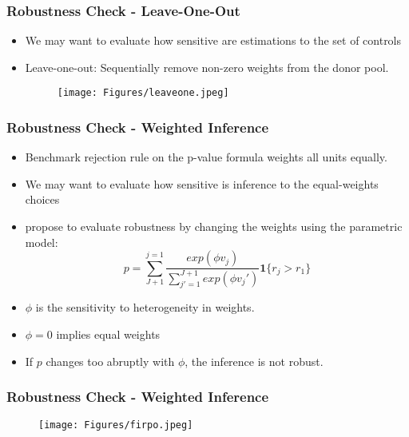 \documentclass[xcolor=svgnames,t]{beamer}
\begin{document}
\begin{frame}
    \frametitle{Robustness Check - Leave-One-Out}
    \begin{itemize}
        \item<1-> We may want to evaluate how sensitive are estimations to the set of controls  
        \item<2-> Leave-one-out: Sequentially remove non-zero weights from the donor pool. 
        \begin{figure}[htbp]
            \centering
            \texttt{[image: Figures/leaveone.jpeg]}
            \label{fig:figure6}
        \end{figure}
    \end{itemize} 
    
    

\end{frame}
\begin{frame}
    \frametitle{Robustness Check - Weighted Inference}
    \begin{itemize}
        \item<1-> Benchmark rejection rule on the p-value formula weights all units equally.  
        \item<2-> We may want to evaluate how sensitive is inference to the equal-weights choices
        \item <3-> \cite{firpo2018synthetic} propose to evaluate robustness by changing the weights using the parametric model:
        $$p=\sum_{J+1}^{j=1}\frac{exp(\phi v_j)}{\sum^{J+1}_{j'=1}exp(\phi v_j')}\mathbf{1}\{r_j > r_1\}$$
       
    \end{itemize} 
    
    

\end{frame}

\begin{frame}
    \begin{itemize}
        \item $\phi$ is the sensitivity to heterogeneity in weights.
        \item $\phi=0$ implies equal weights
        \item If $p$ changes too abruptly with $\phi$, the inference is not robust.
    \end{itemize}
    \frametitle{Robustness Check - Weighted Inference}
    \begin{figure}[htbp]
            \centering
            \texttt{[image: Figures/firpo.jpeg]}
            \label{fig:figure8}
        \end{figure}
    

\end{frame}
\end{document}
